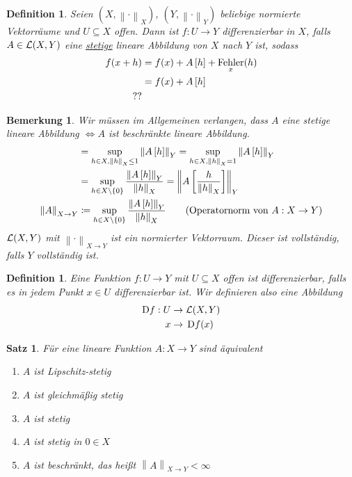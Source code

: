 \documentclass[11pt, twoside, a4paper]{article}
\theoremstyle{plain}
\newtheorem{bemerkung}[blockelement]{Bemerkung}
\newtheorem{definition}[blockelement]{Definition}
\newtheorem{satz}[blockelement]{Satz}
\numberwithin{equation}{subsection}
\newcommand{\set}[1]{\left\{#1\right\}}
\newcommand{\pair}[1]{\left(#1\right)}
\newcommand{\of}[1]{\mathopen{}\mathclose{}\bgroup\left(#1\aftergroup\egroup\right)}
\newcommand{\norm}[1]{\left\lVert#1\right\rVert}
\newcommand{\interv}[1]{\left[#1\right]}
\newcommand{\equivalent}[0]{\Leftrightarrow{}}
\newcommand{\fromto}{\rightarrow{}}
\newcommand{\exclude}[0]{\setminus}
\DeclareMathOperator{\fehler}{Fehler}
\DeclareMathOperator{\D}{D\!}
\newcommand{\mL}{\mathcal{L}}
\begin{document}
    \begin{definition}
        Seien $\pair{X, \norm{\cdot}_X}$, $\pair{Y, \norm{\cdot}_Y}$ beliebige normierte Vektorräume und $U\subseteq X$ offen. Dann ist $f: U\fromto Y$ differenzierbar in $X$, falls $A\in\mL\of{X, Y}$ eine \underline{stetige} lineare Abbildung von $X$ nach $Y$ ist, sodass
        \begin{align*}
            f\of{x+h} &= f\of{x} + A\interv{h} + \fehler_x\of{h}\\
            &= f\of{x} + A\interv{h}\\
            ??
        \end{align*}
    \end{definition}

    \begin{bemerkung}
        Wir müssen im Allgemeinen verlangen, dass $A$ eine stetige lineare Abbildung $\equivalent A$ ist beschränkte lineare Abbildung.
        \begin{align*}
            &= \sup_{h\in X, \norm{h}_X \leq 1} \norm{A\interv{h}}_Y = \sup_{h\in X, \norm{h}_X = 1} \norm{A\interv{h}}_Y\\
            &= \sup_{h\in X\exclude\set{0}} \frac{\norm{A\interv{h}}_Y}{\norm{h}_X} = \norm{A\interv{\frac{h}{\norm{h}_X}}}_Y\\
            \norm{A}_{X\fromto Y} &\coloneqq \sup_{h\in X\exclude\set{0}} \frac{\norm{A\interv{h}}_Y}{\norm{h}_X}\tag{Operatornorm von $A: X\fromto Y$}
        \end{align*}
        $\mL\of{X,Y}$ mit $\norm{\cdot}_{X\fromto Y}$ ist ein normierter Vektorraum. Dieser ist vollständig, falls $Y$ vollständig ist.
    \end{bemerkung}

    \begin{definition}
        Eine Funktion $f: U\fromto Y$ mit $U\subseteq X$ offen ist differenzierbar, falls es in jedem Punkt $x\in U$ differenzierbar ist. Wir definieren also eine Abbildung
        \begin{align*}
            \D f: U&\fromto\mL\of{X, Y}\\
            x&\fromto\D f\of{x}
        \end{align*}
    \end{definition}

    \begin{satz}
        Für eine lineare Funktion $A: X\fromto Y$ sind äquivalent
        \begin{enumerate}[label=(\roman*)]
            \item $A$ ist Lipschitz-stetig
            \item $A$ ist gleichmäßig stetig
            \item $A$ ist stetig
            \item $A$ ist stetig in $0\in X$
            \item $A$ ist beschränkt, das heißt $\norm{A}_{X\fromto Y} < \infty$
        \end{enumerate}
    \end{satz}
\end{document}
